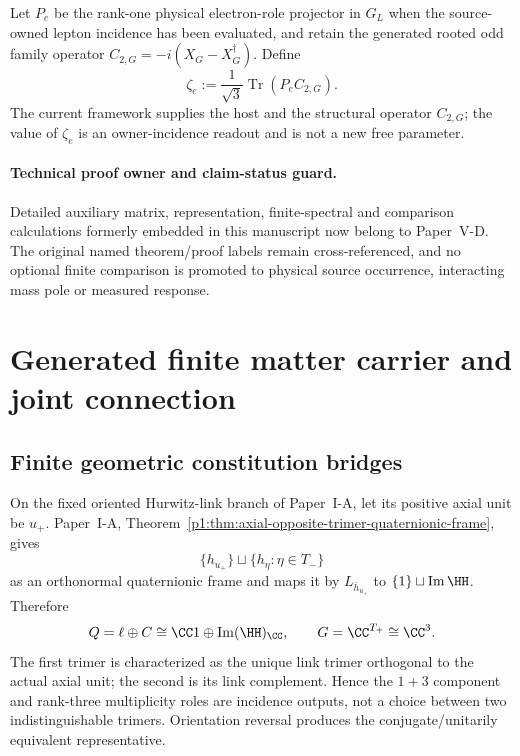 \documentclass[12pt,a4paper]{article}
\begin{document}
\begin{definition}
\label{p5:def:v3106-charged-lepton-orientation-target}
Let $P_e$ be the rank-one physical electron-role projector in $G_L$ when the
source-owned lepton incidence has been evaluated, and retain the generated
rooted odd family operator $C_{2,G}=-i(X_G-X_G^\dagger)$.  Define
\[
 \boxed{\zeta_e:=\frac1{\sqrt3}\operatorname{Tr}(P_eC_{2,G}).}
\]
The current framework supplies the host and the structural operator
$C_{2,G}$; the value of $\zeta_e$ is an owner-incidence readout and is not a
new free parameter.
\end{definition}


\paragraph{Technical proof owner and claim-status guard.}
Detailed auxiliary matrix, representation, finite-spectral and comparison
calculations formerly embedded in this manuscript now belong to
Paper~V-D. The original named theorem/proof labels remain
cross-referenced, and no optional finite comparison is promoted
to physical source occurrence, interacting mass pole or measured response.

\section{Generated finite matter carrier and joint connection}
\label{p5a:sec:organized-carrier}
\subsection{Finite geometric constitution bridges}
\label{p5:sec:finite-geometric-constitution-bridges}

\begin{theorem}
\label{p5:thm:generated-color-family-incidence}
On the fixed oriented Hurwitz-link branch of Paper~I-A, let its positive axial unit be
\(u_+\).  Paper~I-A,
Theorem~\ref{p1:thm:axial-opposite-trimer-quaternionic-frame}, gives
\[
 \{h_{u_+}\}\sqcup\{h_\eta:\eta\in T_-\}
\]
as an orthonormal quaternionic frame and maps it by
\(L_{\bar h_{u_+}}\) to
\(\{1\}\sqcup\operatorname{Im}\HH\).  Therefore
\[
 Q=\ell\oplus C
 \cong\CC1\oplus\operatorname{Im}(\HH)_\CC,
 \qquad
 G=\CC^{T_+}\cong\CC^3 .
\]
The first trimer is characterized as the unique link trimer orthogonal to the
actual axial unit; the second is its link complement.  Hence the \(1+3\)
component and rank-three multiplicity roles are incidence outputs, not a
choice between two indistinguishable trimers.  Orientation reversal produces
the conjugate/unitarily equivalent representative.
\end{theorem}
\end{document}
